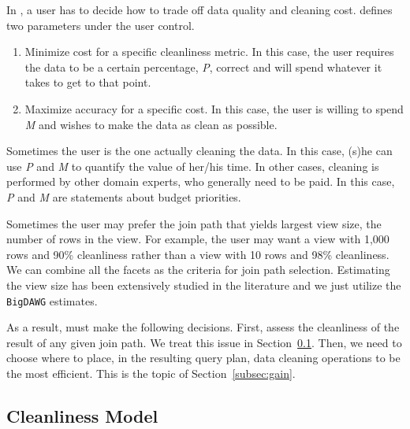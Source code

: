 In \dcv, a user has to decide how to trade off data quality and cleaning cost. 
\dcv defines two parameters under the user control.

\begin{enumerate}
\item Minimize cost for a specific cleanliness metric. In this case, the user requires the data to be a certain percentage, \emph{P}, correct and will spend whatever it takes to get to that point.

\item Maximize accuracy for a specific cost. In this case, the user is willing to spend \emph{M} and wishes to make the data as clean as possible.
\end{enumerate}

Sometimes the user is the one actually cleaning the data. In this case, (s)he can use \emph{P} and \emph{M} to quantify the value of her/his time. 
In other cases, cleaning is performed by other domain experts, who generally need to be paid. In this case, \emph{P} and \emph{M} are statements about budget priorities.

Sometimes the user may prefer the join path that yields largest view size, \ie the number of rows in the view. 
For example, the user may want a view with 1,000 rows and 90\% cleanliness rather than a view with 10 rows and 98\% cleanliness. 
We can combine all the facets as the criteria for join path selection. 
Estimating the view size has been extensively studied in the literature and we just utilize the \texttt{BigDAWG} estimates.

As a result, \dcv must make the following decisions. 
First, assess the cleanliness of the result of any given join path. We treat this issue in Section~\ref{subsec:model}. 
Then, we need to choose where to place, in the resulting query plan, data cleaning operations to be the most efficient. This is the topic of Section~\ref{subsec:gain}.


\subsection{Cleanliness Model}\label{subsec:model}

